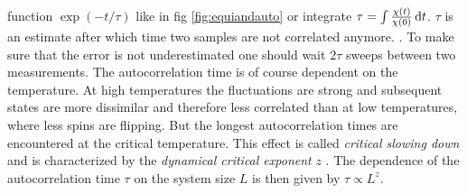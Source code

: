     function \(\exp(-t/\tau)\) like in fig \ref{fig:equiandauto}
    or integrate \(\tau = \int \frac{\chi(t)}{\chi(0)} \,\mathrm{d} t\).
    \(\tau\) is an estimate after which time two samples are not
    correlated anymore. \cite[S. ??]{NewmanBarkema1999} \cite[S. 150f]{Katzgraber2011}.
    To make sure that the error is not underestimated one should wait
    \(2\tau\) sweeps between two measurements.
    The autocorrelation time is of course dependent on the temperature.
    At high temperatures the fluctuations are strong and subsequent
    states are more dissimilar and therefore less correlated than at low
    temperatures, where less spins are flipping. But the longest
    autocorrelation times are encountered at the critical temperature.
    This effect is called \emph{critical slowing down} and is
    characterized by the \emph{dynamical critical exponent} \(z\)
    \cite{SwendsenWang1987}. The dependence of the autocorrelation time
    \(\tau\) on the system size \(L\) is then given by \(\tau \propto L^z\).
